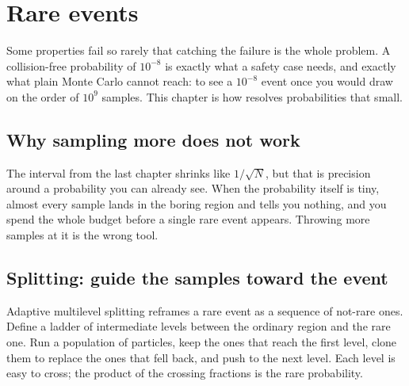 \chapter{Rare events}
\label{ch:rare}

Some properties fail so rarely that catching the failure is the whole problem. A collision-free probability of $10^{-8}$ is exactly what a safety case needs, and exactly what plain Monte Carlo cannot reach: to see a $10^{-8}$ event once you would draw on the order of $10^{9}$ samples. This chapter is how \sentil{} resolves probabilities that small.

\section{Why sampling more does not work}

The interval from the last chapter shrinks like $1/\sqrt{N}$, but that is precision around a probability you can already see. When the probability itself is tiny, almost every sample lands in the boring region and tells you nothing, and you spend the whole budget before a single rare event appears. Throwing more samples at it is the wrong tool.

\section{Splitting: guide the samples toward the event}

Adaptive multilevel splitting reframes a rare event as a sequence of not-rare ones. Define a ladder of intermediate levels between the ordinary region and the rare one. Run a population of particles, keep the ones that reach the first level, clone them to replace the ones that fell back, and push to the next level. Each level is easy to cross; the product of the crossing fractions is the rare probability.

